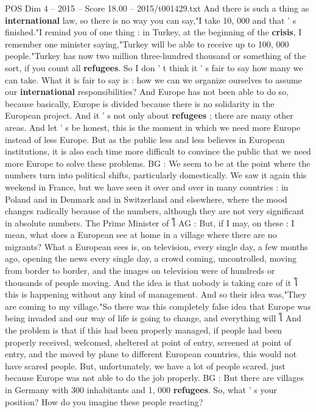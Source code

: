 \begin{textsample}{POS Dim 4 – 2015 – Score 18.00 – 2015/t001429.txt}
And there is such a thing as \textbf{international} law, so there is no way you can say,"I take 10, 000 and that ' s finished."I remind you of one thing : in Turkey, at the beginning of the \textbf{crisis}, I remember one minister saying,"Turkey will be able to receive up to 100, 000 people."Turkey has now two million three-hundred thousand or something of the sort, if you count all \textbf{refugees}.
So I don ' t think it ' s fair to say how many we can take.
What it is fair to say is : how we can we organize ourselves to assume our \textbf{international} responsibilities?
And Europe has not been able to do so, because basically, Europe is divided because there is no solidarity in the European project.
And it ' s not only about \textbf{refugees} ; there are many other areas.
And let ' s be honest, this is the moment in which we need more Europe instead of less Europe.
But as the public less and less believes in European institutions, it is also each time more difficult to convince the public that we need more Europe to solve these problems.
BG : We seem to be at the point where the numbers turn into political shifts, particularly domestically.
We saw it again this weekend in France, but we have seen it over and over in many countries : in Poland and in Denmark and in Switzerland and elsewhere, where the mood changes radically because of the numbers, although they are not very significant in absolute numbers.
The Prime Minister of โ AG : But, if I may, on these : I mean, what does a European see at home in a village where there are no migrants?
What a European sees is, on television, every single day, a few months ago, opening the news every single day, a crowd coming, uncontrolled, moving from border to border, and the images on television were of hundreds or thousands of people moving.
And the idea is that nobody is taking care of it โ this is happening without any kind of management.
And so their idea was,"They are coming to my village."So there was this completely false idea that Europe was being invaded and our way of life is going to change, and everything will โ And the problem is that if this had been properly managed, if people had been properly received, welcomed, sheltered at point of entry, screened at point of entry, and the moved by plane to different European countries, this would not have scared people.
But, unfortunately, we have a lot of people scared, just because Europe was not able to do the job properly.
BG : But there are villages in Germany with 300 inhabitants and 1, 000 \textbf{refugees}.
So, what ' s your position?
How do you imagine these people reacting?

\end{textsample}
